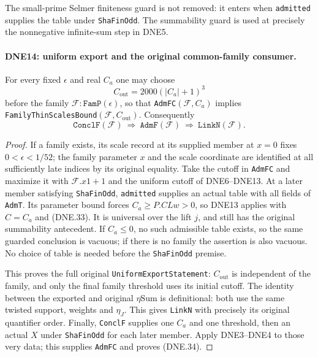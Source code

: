 The small-prime Selmer finiteness guard is not removed: it enters
when \texttt{admitted} supplies the table under
\texttt{ShaFinOdd}.  The summability guard is used at precisely
the nonnegative infinite-sum step in DNE5.

\paragraph{DNE14: uniform export and the original common-family consumer.}
\label{claim:DNE14}
For every fixed $\epsilon$ and real $C_a$ one may choose
\[
                  C_{\mathrm{out}}=2000(|C_a|+1)^3             \tag{DNE.33}
\]
before the family $\mathcal F:\texttt{FamP}(\epsilon)$, so that
\texttt{AdmFC}$(\mathcal F,C_a)$ implies
\texttt{FamilyThinScalesBound}$(\mathcal F,C_{\mathrm{out}})$.
Consequently
\[
 \texttt{ConclF}(\mathcal F)\ \Longrightarrow\ 
 \texttt{AdmF}(\mathcal F)\ \Longrightarrow\ 
 \texttt{LinkN}(\mathcal F).                              \tag{DNE.34}
\]

\begin{proof}
If a family exists, its scale record at its supplied member at
$x=0$ fixes $0<\epsilon<1/52$; the family parameter $x$ and
the scale coordinate are identified at all sufficiently late
indices by its original equality.  Take the cutoff in
\texttt{AdmFC} and maximize it with $\mathcal F.x1+1$ and the
uniform cutoff of DNE6--DNE13.
At a later member satisfying \texttt{ShaFinOdd}, \texttt{admitted}
supplies an actual table with all fields of \texttt{AdmT}.
Its parameter bound forces $C_a\ge P.CLw>0$, so DNE13 applies
with $C=C_a$ and (DNE.33).  It is universal over the lift $j$,
and still has the original summability antecedent.
If $C_a\le0$, no such admissible table exists, so the same guarded
conclusion is vacuous; if there is no family the assertion is
also vacuous.  No choice of table is needed before the
\texttt{ShaFinOdd} premise.

This proves the full original \texttt{UniformExportStatement}:
$C_{\mathrm{out}}$ is independent of the family, and only the
final family threshold uses its initial cutoff.
The identity between the exported and original $\eta\mathrm{Sum}$
is definitional: both use the same twisted support, weights and
$\eta_J$.  This gives \texttt{LinkN} with precisely its original
quantifier order.  Finally, \texttt{ConclF} supplies one $C_a$
and one threshold, then an actual $X$ under \texttt{ShaFinOdd}
for each later member.  Apply DNE3--DNE4 to those very data;
this supplies \texttt{AdmFC} and proves (DNE.34).
\end{proof}

